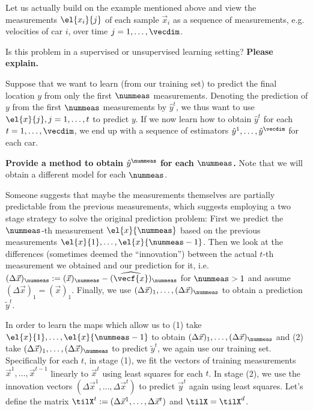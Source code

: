 \documentclass[preview]{standalone}
\begin{document}
Let us actually build on the example mentioned above and view the
measurements $\el{x_i}{j}$ of each sample $\vec{x}_i$ as a sequence of
measurements, e.g. velocities of car $i$, over time
$j = 1,\dots, \vecdim$.

\begin{Parts}

  \Part Is this problem in a supervised or unsupervised learning setting?
      {\bf Please explain.} 

  
\Part Suppose that we want to learn (from our training set) to predict
the final location $y$ from only the first $\nummeas$ measurements.
Denoting the prediction of $y$ from the first $\nummeas$ measurements
by $\hat{y}^t$, we thus want to use $\el{x}{j}, j=1, \ldots, t$ to
predict $y$.  If we now learn how to obtain $\hat{y}^t$ for each
$t= 1,\dots,\vecdim$, we end up with a sequence of estimators
$\hat{y}^1,\dots, \hat{y}^\vecdim$ for each car.

  {\bf  Provide
    a method to obtain $\hat{y}^\nummeas$ for each $\nummeas$. }
  Note that we will obtain a different model for each $\nummeas$.
  



\Part Someone suggests that maybe the measurements themselves are
partially predictable from the previous measurements, which suggests
employing a two stage strategy to solve the original prediction
problem: First we predict the $\nummeas$-th measurement
$\el{x}{\nummeas}$ based on the previous measurements
$\el{x}{1},\dots, \el{x}{\nummeas-1}$. Then we look at the differences
(sometimes deemed the ``innovation'') between the actual $t$-th
measurement we obtained and our prediction for it, i.e.
$(\Delta \vec{ x})_{\nummeas} := (\vec{x})_{\nummeas} -
(\widehat{\vecf{x}})_{\nummeas}$ for $\nummeas > 1$ and assume
$(\Delta \vec{x})_1 = (\vec{x})_1$. Finally, we use
$(\Delta\vec{x})_1,\dots, (\Delta \vec{x})_{\nummeas}$ to obtain a
prediction $\tilde{y}^t$.

In order to learn the maps which allow us to (1) take
$\el{x}{1},\dots, \el{x}{\nummeas-1}$ to obtain
$(\Delta\vec{x})_1,\dots, (\Delta \vec{x})_{\nummeas}$ and (2) take
$(\Delta\vec{x})_1,\dots, (\Delta \vec{x})_{\nummeas}$ to predict
$\tilde{y}^t$, we again use our training set.  Specifically for each
$t$, in stage (1), we fit the vectors of training measurements
$\vec{x}^1, \dots, \vec{x}^{t-1}$ linearly to $\vec{x}^t$ using least
squares for each $t$. In stage (2), we use the innovation vectors
$(\Delta\vec{x}^1, \dots, \Delta\vec{x}^t)$ to predict $\vec{y}^t$
again using least squares.  Let's define the matrix
$\tilX^t := (\Delta\vec{x}^1, \dots, \Delta\vec{x}^t)$ and
$\tilX = \tilX^d$.



\end{Parts}
\end{document}
